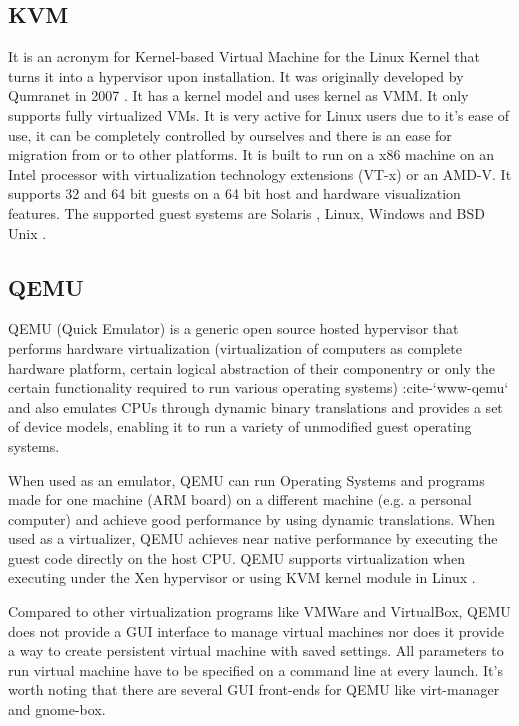 \subsection{KVM}

     It is an acronym for Kernel-based Virtual Machine for the Linux
     Kernel that turns it into a hypervisor upon installation. It was
     originally developed by Qumranet in 2007 \cite{www-KVM-wiki}. It
     has a kernel model and uses kernel as VMM. It only supports fully
     virtualized VMs. It is very active for Linux users due to it’s
     ease of use, it can be completely controlled by ourselves and
     there is an ease for migration from or to other platforms. It is
     built to run on a x86 machine on an Intel processor with
     virtualization technology extensions (VT-x) or an AMD-V. It
     supports 32 and 64 bit guests on a 64 bit host and hardware
     visualization features. The supported guest systems are Solaris ,
     Linux, Windows and BSD Unix \cite{www-KVM-webpage}.

\subsection{QEMU}
     
     QEMU (Quick Emulator) is a generic open source hosted hypervisor
     \cite{www-hypervisor} that performs hardware virtualization
     (virtualization of computers as complete hardware platform,
     certain logical abstraction of their componentry or only the
     certain functionality required to run various operating systems)
     :cite-`www-qemu` and also emulates CPUs through dynamic binary
     translations and provides a set of device models, enabling it to
     run a variety of unmodified guest operating systems.
     
     When used as an emulator, QEMU can run Operating Systems and
     programs made for one machine (ARM board) on a different machine
     (e.g. a personal computer) and achieve good performance by using
     dynamic translations.  When used as a virtualizer, QEMU achieves
     near native performance by executing the guest code directly on
     the host CPU. QEMU supports virtualization when executing under
     the Xen hypervisor or using KVM kernel module in Linux
     \cite{www-qemuwiki}.

     Compared to other virtualization programs like VMWare and VirtualBox,
     QEMU does not provide a GUI interface to manage virtual machines nor
     does it provide a way to create persistent virtual machine with saved
     settings. All parameters to run virtual machine have to be specified
     on a command line at every launch. It’s worth noting that there are
     several GUI front-ends for QEMU like virt-manager and gnome-box.

